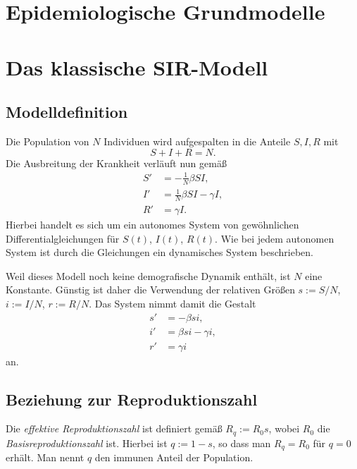 \documentclass[a4paper,10pt,fleqn,twocolumn,dvipdfmx]{scrartcl}
\numberwithin{equation}{section}
\begin{document}
\thispagestyle{empty}

\section*{Epidemiologische Grundmodelle}

\tableofcontents

\section{Das klassische SIR-Modell}
\subsection{Modelldefinition}

Die Population von $N$ Individuen wird aufgespalten in die Anteile
$S,I,R$ mit%
\begin{equation}
S+I+R=N.
\end{equation}
Die Ausbreitung der Krankheit verläuft nun gemäß%
\begin{align}
S' &= -\tfrac{1}{N} \beta SI,\\
I' &= \tfrac{1}{N} \beta SI - \gamma I,\\
R' &= \gamma I.
\end{align}
Hierbei handelt es sich um ein autonomes System von gewöhnlichen
Differentialgleichungen für $S(t)$, $I(t)$, $R(t)$.
Wie bei jedem autonomen System ist durch die Gleichungen ein
dynamisches System beschrieben.

Weil dieses Modell noch keine demografische Dynamik enthält,
ist $N$ eine Konstante. Günstig ist daher die Verwendung der
relativen Größen $s:=S/N$, $i:=I/N$, $r:=R/N$. Das System nimmt
damit die Gestalt%
\begin{align}
\label{eq:sir-s} s' &= -\beta si,\\
\label{eq:sir-i} i' &= \beta si - \gamma i,\\
\label{eq:sir-r} r' &= \gamma i
\end{align}
an.

\subsection{Beziehung zur Reproduktionszahl}

Die \emph{effektive Reproduktionszahl} ist definiert gemäß
$R_q := R_0 s$, wobei $R_0$ die \emph{Basisreproduktionszahl} ist.
Hierbei ist $q:=1-s$, so dass man $R_q=R_0$ für $q=0$ erhält. Man nennt
$q$ den immunen Anteil der Population.
\end{document}
